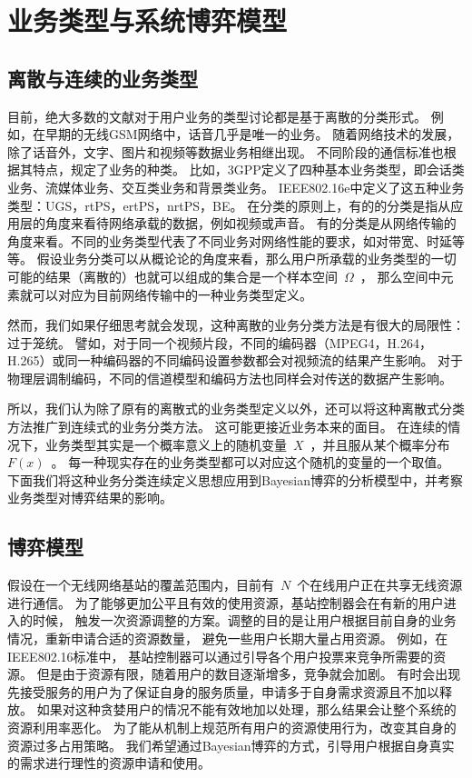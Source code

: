 \section{业务类型与系统博弈模型}
\subsection{离散与连续的业务类型}
目前，绝大多数的文献对于用户业务的类型讨论都是基于离散的分类形式。
例如，在早期的无线GSM网络中，话音几乎是唯一的业务。
随着网络技术的发展，除了话音外，文字、图片和视频等数据业务相继出现。
不同阶段的通信标准也根据其特点，规定了业务的种类。
比如，3GPP定义了四种基本业务类型，即会话类业务、流媒体业务、交互类业务和背景类业务。
IEEE802.16e中定义了这五种业务类型：UGS，rtPS，ertPS，nrtPS，BE。
在分类的原则上，有的的分类是指从应用层的角度来看待网络承载的数据，例如视频或声音。
有的分类是从网络传输的角度来看。不同的业务类型代表了不同业务对网络性能的要求，如对带宽、时延等等。
假设业务分类可以从概论论的角度来看，那么用户所承载的业务类型的一切可能的结果（离散的）也就可以组成的集合是一个样本空间~$\Omega$~，
那么空间中元素就可以对应为目前网络传输中的一种业务类型定义。

然而，我们如果仔细思考就会发现，这种离散的业务分类方法是有很大的局限性：过于笼统。
譬如，对于同一个视频片段，不同的编码器（MPEG4，H.264，H.265）或同一种编码器的不同编码设置参数都会对视频流的结果产生影响。
对于物理层调制编码，不同的信道模型和编码方法也同样会对传送的数据产生影响。

所以，我们认为除了原有的离散式的业务类型定义以外，还可以将这种离散式分类方法推广到连续式的业务分类方法。
这可能更接近业务本来的面目。
在连续的情况下，业务类型其实是一个概率意义上的随机变量~$X$~，并且服从某个概率分布~$F(x)$~。
每一种现实存在的业务类型都可以对应这个随机的变量的一个取值。
下面我们将这种业务分类连续定义思想应用到Bayesian博弈的分析模型中，并考察业务类型对博弈结果的影响。

\subsection{博弈模型}
假设在一个无线网络基站的覆盖范围内，目前有~$N$~个在线用户正在共享无线资源进行通信。
为了能够更加公平且有效的使用资源，基站控制器会在有新的用户进入的时候，
触发一次资源调整的方案。调整的目的是让用户根据目前自身的业务情况，重新申请合适的资源数量，
避免一些用户长期大量占用资源。
例如，在IEEE802.16标准中，
基站控制器可以通过引导各个用户投票来竞争所需要的资源。
但是由于资源有限，随着用户的数目逐渐增多，竞争就会加剧。
有时会出现先接受服务的用户为了保证自身的服务质量，申请多于自身需求资源且不加以释放。
如果对这种贪婪用户的情况不能有效地加以处理，那么结果会让整个系统的资源利用率恶化。
为了能从机制上规范所有用户的资源使用行为，改变其自身的资源过多占用策略。
我们希望通过Bayesian博弈的方式，引导用户根据自身真实的需求进行理性的资源申请和使用。


